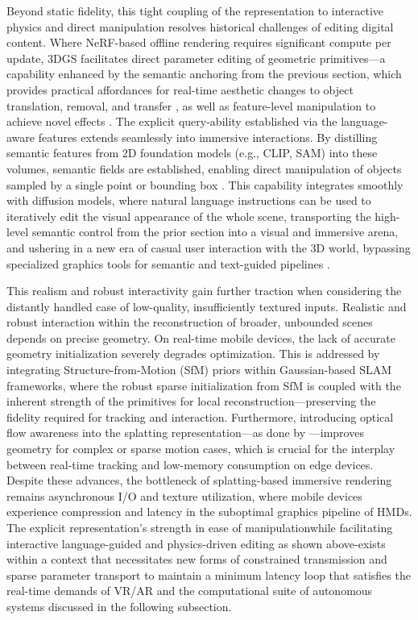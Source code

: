 \documentclass[11pt,a4paper]{article}
\begin{document}
Beyond static fidelity, this tight coupling of the representation to interactive physics and direct manipulation resolves historical challenges of editing digital content. Where NeRF-based offline rendering requires significant compute per update, 3DGS facilitates direct parameter editing of geometric primitives---a capability enhanced by the semantic anchoring from the previous section, which provides practical affordances for real-time aesthetic changes to object translation, removal, and transfer \cite{arxiv:2312.14937v3}, as well as feature-level manipulation to achieve novel effects \cite{arxiv:2312.03203v3}. The explicit query-ability established via the language-aware features extends seamlessly into immersive interactions. By distilling semantic features from 2D foundation models (e.g., CLIP, SAM) into these volumes, semantic fields are established, enabling direct manipulation of objects sampled by a single point or bounding box \cite{arxiv:2312.03203v3}. This capability integrates smoothly with diffusion models, where natural language instructions can be used to iteratively edit the visual appearance of the whole scene, transporting the high-level semantic control from the prior section into a visual and immersive arena, and ushering in a new era of casual user interaction with the 3D world, bypassing specialized graphics tools for semantic and text-guided pipelines \cite{arxiv:2311.16037v1,arxiv:2403.08733v3}.

This realism and robust interactivity gain further traction when considering the distantly handled case of low-quality, insufficiently textured inputs. Realistic and robust interaction within the reconstruction of broader, unbounded scenes depends on precise geometry. On real-time mobile devices, the lack of accurate geometry initialization severely degrades optimization. This is addressed by integrating Structure-from-Motion (SfM) priors within Gaussian-based SLAM frameworks, where the robust sparse initialization from SfM is coupled with the inherent strength of the primitives for local reconstruction---preserving the fidelity required for tracking and interaction. Furthermore, introducing optical flow awareness into the splatting representation---as done by \cite{arxiv:2403.11447v1}---improves geometry for complex or sparse motion cases, which is crucial for the interplay between real-time tracking and low-memory consumption on edge devices. Despite these advances, the bottleneck of splatting-based immersive rendering remains asynchronous I/O and texture utilization, where mobile devices experience compression and latency in the suboptimal graphics pipeline of HMDs. The explicit representation's strength in ease of manipulationwhile facilitating interactive language-guided and physics-driven editing as shown above-exists within a context that necessitates new forms of constrained transmission and sparse parameter transport to maintain a minimum latency loop that satisfies the real-time demands of VR/AR and the computational suite of autonomous systems discussed in the following subsection.
\end{document}
